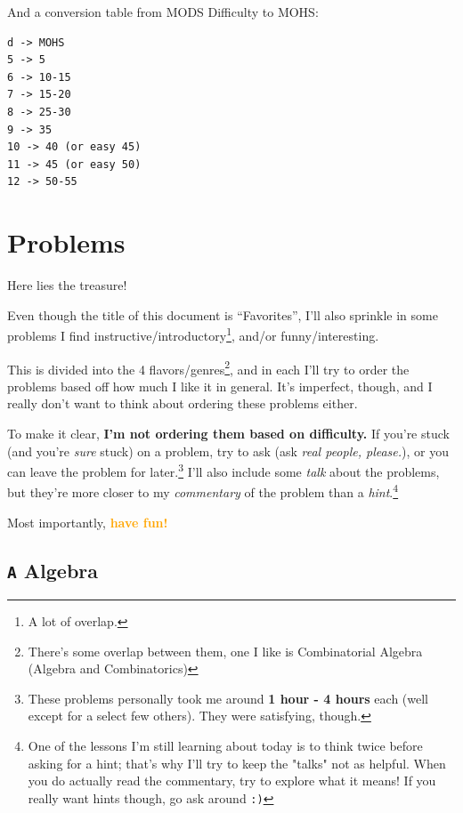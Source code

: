 \documentclass[11pt]{article} %
\theoremstyle{definition}
\theoremstyle{remark}
\begin{document}
And a conversion table from MODS Difficulty to MOHS:
\begin{verbatim}
d -> MOHS
5 -> 5
6 -> 10-15
7 -> 15-20
8 -> 25-30
9 -> 35
10 -> 40 (or easy 45)
11 -> 45 (or easy 50)
12 -> 50-55
\end{verbatim}

\newpage
\section{Problems}

Here lies the treasure!

Even though the title of this document is ``Favorites'', I'll also sprinkle in some problems I find instructive/introductory\footnote{A lot of overlap.}, and/or funny/interesting.

This is divided into the 4 flavors/genres\footnote{There's some overlap between them, one I like is Combinatorial Algebra (Algebra and Combinatorics)}, and in each I'll try to order the problems based off how much I like it in general. It's imperfect, though, and I really don't want to think about ordering these problems either.

To make it clear, \textbf{I'm not ordering them based on difficulty.} If you're stuck (and you're \emph{sure} stuck) on a problem, try to ask (ask \emph{real people, please.}), or you can leave the problem for later.\footnote{These problems personally took me around \textbf{1 hour - 4 hours} each (well except for a select few others). They were satisfying, though.} I'll also include some \emph{talk} about the problems, but they're more closer to my \emph{commentary} of the problem than a \emph{hint}.\footnote{One of the lessons I'm still learning about today is to think twice before asking for a hint; that's why I'll try to keep the "talks" not as helpful. When you do actually read the commentary, try to explore what it means! If you really want hints though, go ask around \texttt{:)}}

Most importantly, \textcolor{orange}{\textbf{have fun!}}

\subsection{\texttt{A} Algebra}
\setcounter{problem}{0}
\end{document}
